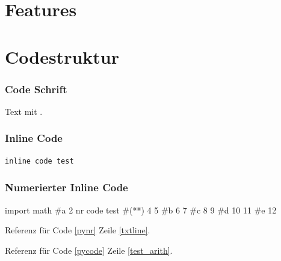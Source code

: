 
\section{Features}



\section{Codestruktur}






\appendix
\newpage
%

\clearpage
\listoffigures
\clearpage
\listoftables
\clearpage
\lstlistoflistings
\clearpage
\nocite{*}
\printbibliography



\subsubsection*{Code Schrift}
Text mit   .

\subsubsection*{Inline Code}
\begin{lstlisting}[caption=CAP]
inline code test
\end{lstlisting}

\vspace{4ex}
\subsubsection*{Numerierter Inline Code}
\begin{nrcode}[caption=CCC, label=pynr, linerange={a-c, d-e}]
import math
#\*a
2
nr code test #(*\label{txtline}*)
4
5
#\*b
6
7
#\*c
8
9
#\*d
10
11
#\*e
12
\end{nrcode}

Referenz für Code \ref{pynr} Zeile \ref{txtline}.

Referenz für Code \ref{pycode} Zeile \ref{test_arith}.